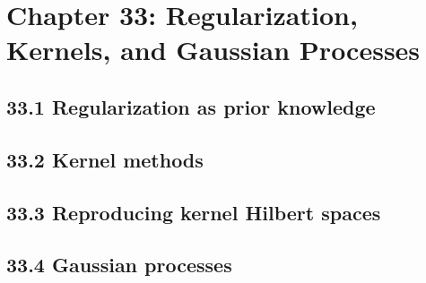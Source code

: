 \section{Chapter 33: Regularization, Kernels, and Gaussian Processes}

\subsection{33.1 Regularization as prior knowledge}

\subsection{33.2 Kernel methods}

\subsection{33.3 Reproducing kernel Hilbert spaces}

\subsection{33.4 Gaussian processes}

\clearpage
